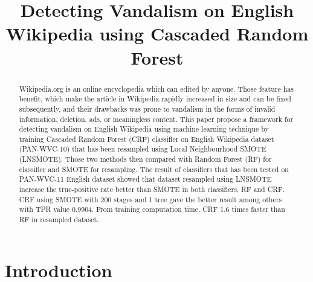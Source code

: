 \documentclass[conference,compsoc,a4paper,twocolumn,final]{IEEEtran}
\begin{document}

\title{Detecting Vandalism on English Wikipedia using Cascaded Random Forest}

\author{%
	\and
}

\maketitle



\begin{abstract}
Wikipedia.org is an online encyclopedia which can edited by anyone.
Those feature has benefit, which make the article in Wikipedia rapidly
increased in size and can be fixed subsequently, and their drawbacks was prone
to vandalism in the forms of invalid information, deletion, ads, or meaningless
content.
This paper propose a framework for detecting vandalism on English Wikipedia
using machine learning technique by training Cascaded Random Forest (CRF)
classifier on English Wikipedia dataset (PAN-WVC-10) that has been resampled
using Local Neighbourhood SMOTE (LNSMOTE).
Those two methods then compared with Random Forest (RF) for classifier and
SMOTE for resampling.
The result of classifiers that has been tested on PAN-WVC-11 English dataset
showed that dataset resampled using LNSMOTE increase the true-positive rate
better than SMOTE in both classifiers, RF and CRF.
CRF using SMOTE with 200 stages and 1 tree gave the better result among others
with TPR value 0.9904.
From training computation time, CRF 1.6 times faster than RF in resampled
dataset.
\end{abstract}



\section{Introduction}
\label{section:introduction}
\end{document}
